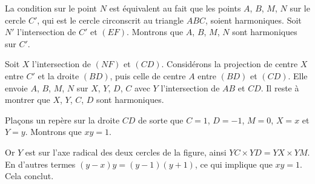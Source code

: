 \begin{sol}
\begin{center}

\end{center}

La condition sur le point $N$ est équivalent au fait que les points $A$, $B$, $M$, $N$ sur le cercle $C'$, qui est le cercle circonscrit au triangle $ABC$, soient harmoniques. Soit $N'$ l'intersection de $C'$ et $(EF)$. Montrons que $A$, $B$, $M$, $N$ sont harmoniques sur $C'$.

\medskip

Soit $X$ l'intersection de $(NF)$ et $(CD)$. Considérons la projection de centre $X$ entre $C'$ et la droite $(BD)$, puis celle de centre $A$ entre $(BD)$ et $(CD)$. Elle envoie $A$, $B$, $M$, $N$ sur $X$, $Y$, $D$, $C$ avec $Y$ l'intersection de $AB$ et $CD$. Il reste à montrer que $X$, $Y$, $C$, $D$ sont harmoniques.

\medskip

Plaçons un repère sur la droite $CD$ de sorte que $C=1$, $D=-1$, $M=0$, $X=x$ et $Y=y$. Montrons que $xy=1$.

Or $Y$ est sur l'axe radical des deux cercles de la figure, ainsi $YC\times YD=YX\times YM$. En d'autres termes $(y-x)y = (y - 1)(y + 1)$, ce qui implique que $xy = 1$. Cela conclut.
\end{sol}


